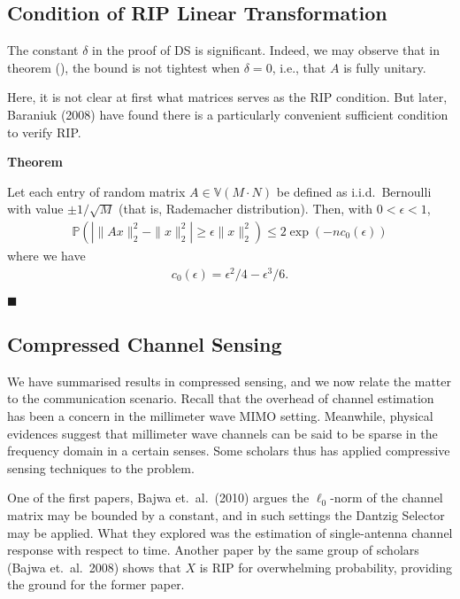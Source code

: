 \documentclass[12pt]{article}
\newcommand{\MB}[1]{\mathbb{#1}}
\newcounter{NumResult}
\newcommand{\myCount}
{
   \stepcounter{NumResult}
   \textbf{\arabic{NumResult}}
}
\newcommand {\Result} [2]
{
   \bigskip
   \myCount \textbf{#1} \par
   {#2} \par
   \hfill \(\blacksquare\)
   \bigskip
}
\begin{document}
\subsection{Condition of RIP Linear Transformation}

The constant \(\delta\) in the proof of DS is significant.
Indeed, we may observe that in theorem (), the bound is not tightest when \(\delta=0\), i.e., that \(A\) is fully unitary.

Here, it is not clear at first what matrices serves as the RIP condition.
But later, Baraniuk (2008) have found there is a particularly convenient sufficient condition to verify RIP.

\Result
{Theorem}
{
Let each entry of random matrix \(A \in \MB{V}(M \cdot N)\) be defined as i.i.d.\ Bernoulli with value \(\pm 1/\sqrt{M}\) (that is, Rademacher distribution).
Then, with \(0 <\epsilon <1\),
\begin{gather}
   \MB{P}( |\|Ax\|_2^2 -\|x\|_2^2| \geq \epsilon \|x\|_2^2)
   \leq 2 \exp(-n c_0(\epsilon))
\end{gather}
where we have
\begin{gather}
c_0(\epsilon)
=\epsilon^2/4 -\epsilon^3/6.
\end{gather}
}

\subsection{Compressed Channel Sensing}

We have summarised results in compressed sensing, and we now relate the matter to the communication scenario.
Recall that the overhead of channel estimation has been a concern in the millimeter wave MIMO setting.
Meanwhile, physical evidences suggest that millimeter wave channels can be said to be sparse in the frequency domain in a certain senses.
Some scholars thus has applied compressive sensing techniques to the problem.

One of the first papers, Bajwa et.\ al.\ (2010) argues the \(\ell_0\)-norm of the channel matrix may be bounded by a constant, and in such settings the Dantzig Selector may be applied.
What they explored was the estimation of single-antenna channel response with respect to time.
Another paper by the same group of scholars (Bajwa et.\ al.\ 2008) shows that \(X\) is RIP for overwhelming probability, providing the ground for the former paper.
\end{document}
